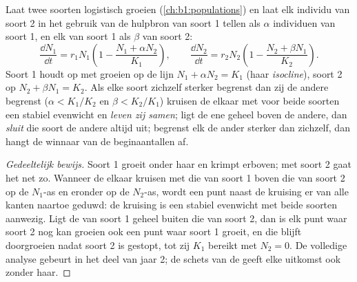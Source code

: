 \begin{proposition}\label{prop:b1:species-interactions:lotka}
Laat twee soorten logistisch groeien (\cref{ch:b1:populations}) en laat elk
individu van soort 2 in het gebruik van de hulpbron van soort 1 tellen als
$\alpha$ individuen van soort 1, en elk van soort 1 als $\beta$ van
soort 2:
\[
\frac{\dd N_1}{\dd t} = r_1 N_1\left(1 - \frac{N_1 + \alpha N_2}{K_1}\right),
\qquad
\frac{\dd N_2}{\dd t} = r_2 N_2\left(1 - \frac{N_2 + \beta N_1}{K_2}\right).
\]
Soort 1 houdt op met groeien op de lijn $N_1 + \alpha N_2 = K_1$ (haar
\emph{isocline}), soort 2 op $N_2 + \beta N_1 = K_2$. Als
elke soort zichzelf sterker begrenst dan zij de andere begrenst ($\alpha <
K_1/K_2$ en $\beta < K_2/K_1$) kruisen de  elkaar met voor beide
soorten een stabiel evenwicht en \emph{leven zij samen}; ligt de ene
 geheel boven de andere, dan \emph{sluit} die soort de andere altijd
uit; begrenst elk de ander sterker dan zichzelf, dan hangt de winnaar van de
beginaantallen af.
\end{proposition}
\begin{proof}[Gedeeltelijk bewijs]
Soort 1 groeit onder haar  en krimpt erboven; met soort 2 gaat het
net zo. Wanneer de  elkaar kruisen met die van soort 1 boven die
van soort 2 op de $N_1$-as en eronder op de $N_2$-as, wordt een punt naast
de kruising er van alle kanten naartoe geduwd: de kruising is een stabiel
evenwicht met beide soorten aanwezig. Ligt de  van soort 1 geheel
buiten die van soort 2, dan is elk punt waar soort 2 nog kan groeien ook een
punt waar soort 1 groeit, en die blijft doorgroeien nadat soort 2 is
gestopt, tot zij $K_1$ bereikt met $N_2 = 0$. De volledige analyse gebeurt
in het deel van jaar 2; de schets van de  geeft elke uitkomst ook
zonder haar.
\end{proof}

